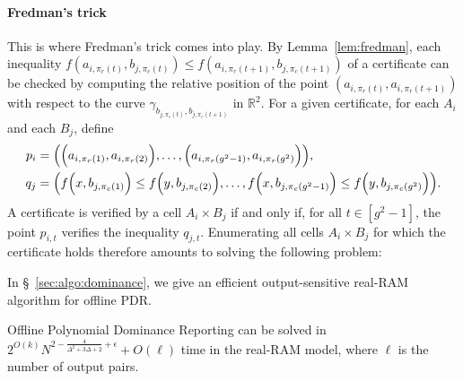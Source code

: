 \paragraph{Fredman's trick}
This is where Fredman's trick comes into play.
By Lemma~\ref{lem:fredman}, each inequality
$f(a_{i,\pi_r(t)},b_{j,\pi_c(t)}) \le f(a_{i,\pi_r(t+1)},b_{j,\pi_c(t+1)})$
of a certificate can be checked
by computing the relative position of
the point $(a_{i,\pi_r(t)},a_{i,\pi_r(t+1)})$ with
respect to the curve $\gamma_{b_{j,\pi_c(t)},b_{j,\pi_c(t+1)}}$ in
\(\mathbb{R}^2\).
For a given certificate, for each $A_i$ and each $B_j$, define
%
\begin{align*}
p_i &= \mleft(
    \Big(a_{i,\pi_r(1)},a_{i,\pi_r(2)}\Big),
    \ldots,
    \Big(a_{i,\pi_r(g^2-1)},a_{i,\pi_r(g^2)}\Big)
\mright),\\
q_j &= \mleft(
    f\Big(x,b_{j,\pi_c(1)}\Big) \le f\Big(y,b_{j,\pi_c(2)}\Big),
    \ldots,
    f\Big(x,b_{j,\pi_c(g^2-1)}\Big) \le f\Big(y,b_{j,\pi_c(g^2)}\Big)
\mright).
\end{align*}
%
A certificate is verified by a cell $A_i \times B_j$ if and only if, for all
$t \in [g^2-1]$, the point $p_{i,t}$ verifies the inequality $q_{j,t}$.
Enumerating all cells $A_i\times B_j$ for which the
certificate holds therefore amounts to solving the following problem:
%

%
In \S~\ref{sec:algo:dominance},
we give an efficient output-sensitive real-RAM algorithm
for offline PDR.
%
\begin{lemma}[%
    label={lem:dominance}%
]
    Offline Polynomial Dominance Reporting can be solved in
    $2^{O(k)} N^{2-\frac{4}{\Delta^2+3\Delta+2}+\epsilon} + O(\ell)$
    time in the real-RAM model,
    where \(\ell\) is the number of output pairs.
\end{lemma}

